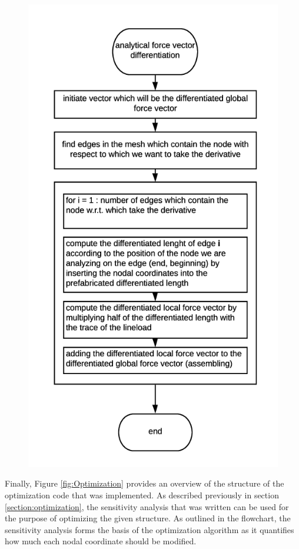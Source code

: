 \begin{figure}[ht]
\begin{minipage}{.5\textwidth}
  \centering
  \includegraphics[width=1.0\linewidth]{images/vectordifferentiation.png}
  \label{fig:Vector}
\end{minipage}
\end{figure}
Finally, Figure \ref{fig:Optimization} provides an overview of the structure of the optimization code that was implemented. As described previously in section \ref{section:optimization}, the sensitivity analysis that was written can be used for the purpose of optimizing the given structure. As outlined in the flowchart, the sensitivity analysis forms the basis of the optimization algorithm as it quantifies how much each nodal coordinate should be modified.\\[3pt]
